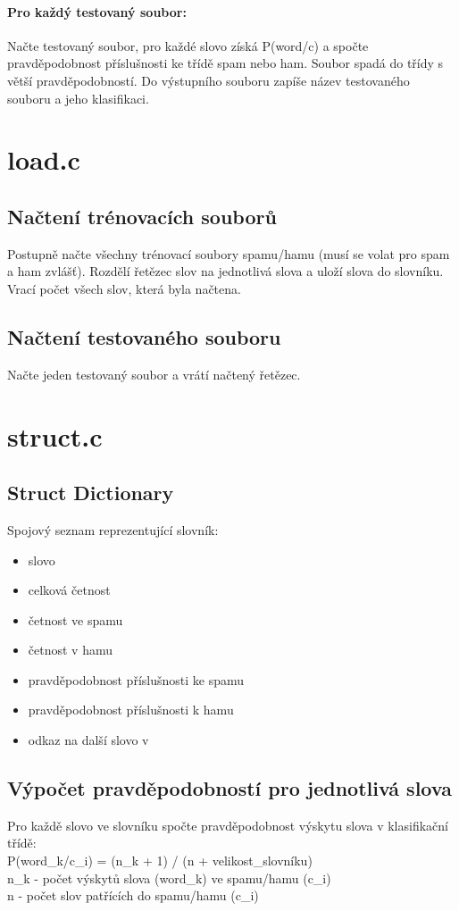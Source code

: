 \documentclass[12pt, a4paper]{report}
\begin{document}
\paragraph{Pro každý testovaný soubor:}
Načte testovaný soubor, pro každé slovo získá P(word/c) a spočte pravděpodobnost příslušnosti ke třídě spam nebo ham. Soubor spadá do třídy s větší pravděpodobností. Do výstupního souboru zapíše název testovaného souboru a jeho klasifikaci.

\section{load.c}
\subsection{Načtení trénovacích souborů}
Postupně načte všechny trénovací soubory spamu/hamu (musí se volat pro spam a ham zvlášť). Rozdělí řetězec slov na jednotlivá slova a uloží slova do slovníku.\\
Vrací počet všech slov, která byla načtena.
\subsection{Načtení testovaného souboru}
Načte jeden testovaný soubor a vrátí načtený řetězec.

\section{struct.c}
\subsection{Struct Dictionary}
Spojový seznam reprezentující slovník:
\begin{itemize}
	\item slovo
	\item celková četnost
	\item četnost ve spamu
	\item četnost v hamu
	\item pravděpodobnost příslušnosti ke spamu
	\item pravděpodobnost příslušnosti k hamu
	\item odkaz na další slovo v 
\end{itemize}

\subsection{Výpočet pravděpodobností pro jednotlivá slova}
Pro každě slovo ve slovníku spočte pravděpodobnost výskytu slova v klasifikační třídě:\\
P(word_k/c_i) = (n_k + 1) / (n + velikost\_slovníku)\\
n_k - počet výskytů slova (word_k) ve spamu/hamu (c_i)\\
n - počet slov patřících do spamu/hamu (c_i)
\end{document}
